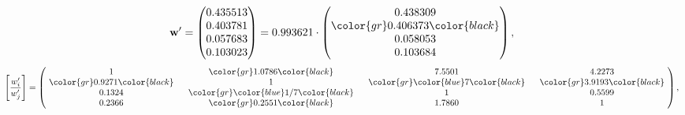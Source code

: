 \begin{example}
\begin{equation*}
\mathbf{w}^{\prime} =
\begin{pmatrix}
0.435513\\
0.403781\\
0.057683\\
0.103023
\end{pmatrix} =
0.993621\cdot
\begin{pmatrix}
0.438309\\
\color{gr} 0.406373\color{black} \\
0.058053\\
0.103684
\end{pmatrix},
\end{equation*}
\begin{equation*}
\left[ \frac{{w}^{\prime}_i}{{w}^{\prime}_j} \right] =
\begin{pmatrix}
$\,\,$ 1 $\,\,$ & $\,\,$\color{gr} 1.0786\color{black} $\,\,$ & $\,\,$7.5501$\,\,$ & $\,\,$4.2273$\,\,$ \\
$\,\,$\color{gr} 0.9271\color{black} $\,\,$ & $\,\,$ 1 $\,\,$ & $\,\,$\color{gr} \color{blue} 7\color{black} $\,\,$ & $\,\,$\color{gr} 3.9193\color{black}   $\,\,$ \\
$\,\,$0.1324$\,\,$ & $\,\,$\color{gr} \color{blue}  1/7\color{black} $\,\,$ & $\,\,$ 1 $\,\,$ & $\,\,$0.5599 $\,\,$ \\
$\,\,$0.2366$\,\,$ & $\,\,$\color{gr} 0.2551\color{black} $\,\,$ & $\,\,$1.7860$\,\,$ & $\,\,$ 1  $\,\,$ \\
\end{pmatrix},
\end{equation*}
\end{example}
\newpage
